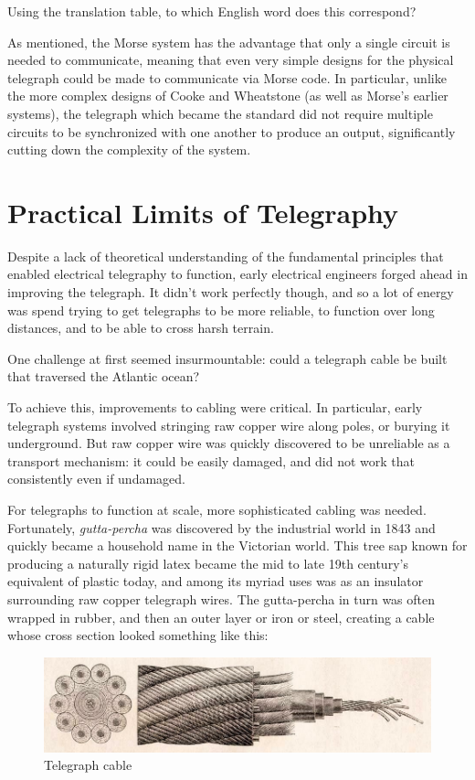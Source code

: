 \documentclass[UTF8]{book}
\begin{document}
\begin{CJK}{UTF8}{gbsn}
Using the translation table, to which English word does this correspond?

As mentioned, the Morse system has the advantage that only a single circuit is needed to communicate, meaning that even very simple designs for the physical telegraph could be made to communicate via Morse code. In particular, unlike the more complex designs of Cooke and Wheatstone (as well as Morse's earlier systems), the telegraph which became the standard did not require multiple circuits to be synchronized with one another to produce an output, significantly cutting down the complexity of the system.

\section{Practical Limits of Telegraphy}

Despite a lack of theoretical understanding of the fundamental principles that enabled electrical telegraphy to function, early electrical engineers forged ahead in improving the telegraph. It didn't work perfectly though, and so a lot of energy was spend trying to get telegraphs to be more reliable, to function over long distances, and to be able to cross harsh terrain.

One challenge at first seemed insurmountable: could a telegraph cable be built that traversed the Atlantic ocean?

To achieve this, improvements to cabling were critical. In particular, early telegraph systems involved stringing raw copper wire along poles, or burying it underground. But raw copper wire was quickly discovered to be unreliable as a transport mechanism: it could be easily damaged, and did not work that consistently even if undamaged.

For telegraphs to function at scale, more sophisticated cabling was needed. Fortunately, \emph{gutta-percha} was discovered by the industrial world in 1843 and quickly became a household name in the Victorian world. This tree sap known for producing a naturally rigid latex became the mid to late 19th century's equivalent of plastic today, and among its myriad uses was as an insulator surrounding raw copper telegraph wires. The gutta-percha in turn was often wrapped in rubber, and then an outer layer or iron or steel, creating a cable whose cross section looked something like this:

\begin{figure}[H]
\centering
\includegraphics[width=0.8\linewidth]{cable-cross-section}
\caption{Telegraph cable}
\end{figure}


\end{CJK}
\end{document}
